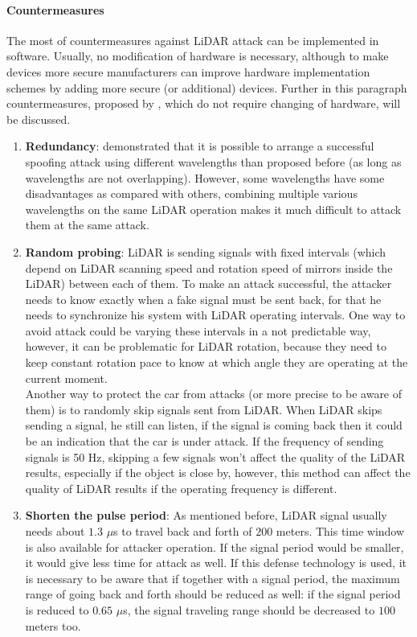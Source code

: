 \paragraph{Countermeasures}
The most of countermeasures against \gls{LiDAR} attack can be implemented in software. Usually, no modification of hardware is necessary, although to make devices more secure manufacturers can improve hardware implementation schemes by adding more secure (or additional) devices. Further in this paragraph countermeasures, proposed by \cite{AttacksOnSensors}, which do not require changing of hardware, will be discussed.
\begin{enumerate}
	\item \textbf{Redundancy}: \cite{diffWaveLenght} demonstrated that it is possible to arrange a successful spoofing attack using different wavelengths than proposed before (as long as wavelengths are not overlapping). However, some wavelengths have some disadvantages as compared with others, combining multiple various wavelengths on the same \gls{LiDAR} operation makes it much difficult to attack them at the same attack.
	\item \textbf{Random probing}: \gls{LiDAR} is sending signals with fixed intervals (which depend on \gls{LiDAR} scanning speed and rotation speed of mirrors inside the \gls{LiDAR}) between each of them. To make an attack successful, the attacker needs to know exactly when a fake signal must be sent back, for that he needs to synchronize his system with \gls{LiDAR} operating intervals. One way to avoid attack could be varying these intervals in a not predictable way, however, it can be problematic for \gls{LiDAR} rotation, because they need to keep constant rotation pace to know at which angle they are operating at the current moment. \\
	Another way to protect the car from attacks (or more precise to be aware of them) is to randomly skip signals sent from \gls{LiDAR}. When \gls{LiDAR} skips sending a signal, he still can listen, if the signal is coming back then it could be an indication that the car is under attack. If the frequency of sending signals is 50 Hz, skipping a few signals won't affect the quality of the \gls{LiDAR} results, especially if the object is close by, however, this method can affect the quality of \gls{LiDAR} results if the operating frequency is different. 
	\item \textbf{Shorten the pulse period}: As mentioned before, \gls{LiDAR} signal usually needs about $1.3$ $\mu$s to travel back and forth of $200$ meters. This time window is also available for attacker operation.  If the signal period would be smaller, it would give less time for attack as well. If this defense technology is used, it is necessary to be aware that if together with a signal period, the maximum range of going back and forth should be reduced as well: if the signal period is reduced to $0.65$ $\mu$s, the signal traveling range should be decreased to $100$ meters too.
\end{enumerate}

